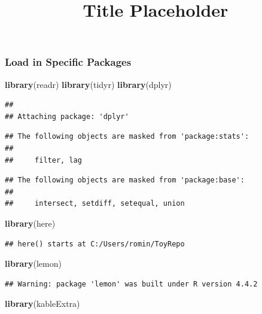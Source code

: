 \documentclass[
]{article}
\title{Title Placeholder}
\author{}
\date{\vspace{-2.5em}}
\newenvironment{Shaded}{\begin{snugshade}}{\end{snugshade}}
\newcommand{\FunctionTok}[1]{\textcolor[rgb]{0.13,0.29,0.53}{\textbf{#1}}}
\newcommand{\NormalTok}[1]{#1}
\begin{document}
\maketitle

\subsubsection{Load in Specific
Packages}\label{load-in-specific-packages}

\begin{Shaded}
\begin{Highlighting}[]
\FunctionTok{library}\NormalTok{(readr)}
\FunctionTok{library}\NormalTok{(tidyr)}
\FunctionTok{library}\NormalTok{(dplyr)}
\end{Highlighting}
\end{Shaded}

\begin{verbatim}
## 
## Attaching package: 'dplyr'
\end{verbatim}

\begin{verbatim}
## The following objects are masked from 'package:stats':
## 
##     filter, lag
\end{verbatim}

\begin{verbatim}
## The following objects are masked from 'package:base':
## 
##     intersect, setdiff, setequal, union
\end{verbatim}

\begin{Shaded}
\begin{Highlighting}[]
\FunctionTok{library}\NormalTok{(here)}
\end{Highlighting}
\end{Shaded}

\begin{verbatim}
## here() starts at C:/Users/romin/ToyRepo
\end{verbatim}

\begin{Shaded}
\begin{Highlighting}[]
\FunctionTok{library}\NormalTok{(lemon)}
\end{Highlighting}
\end{Shaded}

\begin{verbatim}
## Warning: package 'lemon' was built under R version 4.4.2
\end{verbatim}

\begin{Shaded}
\begin{Highlighting}[]
\FunctionTok{library}\NormalTok{(kableExtra)}
\end{Highlighting}
\end{Shaded}
\end{document}
